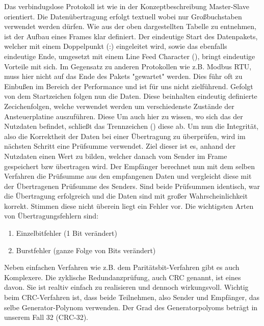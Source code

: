 Das verbindugslose Protokoll ist wie in der Konzeptbeschreibung Master-Slave orientiert. Die Datenübertragung erfolgt textuell wobei nur Großbuchstaben verwendet werden dürfen.\newline\newline
Wie aus der oben dargestellten Tabelle zu entnehmen, ist der Aufbau eines Frames klar definiert. Der eindeutige Start des Datenpakets, welcher mit einem Doppelpunkt (:) eingeleitet wird, sowie das ebenfalls eindeutige Ende, umgesetzt mit einem Line Feed Character (),
bringt eindeutige Vorteile mit sich. Im Gegensatz zu anderen Protokollen wie z.B. Modbus RTU, muss hier nicht auf das Ende des Pakets "gewartet" werden. Dies führ oft zu Einbußen im Bereich der Performance und ist für uns nicht zielführend.\newline\newline
Gefolgt von dem Startzeichen folgen nun die Daten. Diese beinhalten eindeutig definierte Zecichenfolgen, welche verwendet werden um verschiedenste Zustände der Ansteuerplatine auszuführen. Diese Um auch hier zu wissen, wo sich das der Nutzdaten befindet, schließt das Trennzeichen () diese ab.\newline\newline
Um nun die Integrität, also die Korrektheit der Daten bei einer Übertragung zu überprüfen, wird im nächsten Schritt eine Prüfsumme verwendet. Ziel dieser ist es, anhand der Nutzdaten einen Wert zu bilden, welcher danach vom Sender im Frame gespeichert bzw übertragen wird.
Der Empfänger berechnet nun mit dem selben Verfahren die Prüfsumme aus den empfangenen Daten und vergleicht diese mit der Übertragenen Prüfsumme des Senders. Sind beide Prüfsummen identisch, war die Übertragung erfolgreich und die Daten sind mit großer Wahrscheinlichkeit korrekt.
Stimmen diese nicht überein liegt ein Fehler vor. Die wichtigsten Arten von Übertragungsfehlern sind:
\begin{enumerate}
    \item Einzelbitfehler (1 Bit verändert)
    \item Burstfehler (ganze Folge von Bits verändert)
\end{enumerate}

Neben einfachen Verfahren wie z.B. dem Paritätsbit-Verfahren gibt es auch Komplexere. Die zyklische Redundanzprüfung, auch CRC genannt, ist eines davon. Sie ist realtiv einfach zu realisieren und dennoch wirkungsvoll.
Wichtig beim CRC-Verfahren ist, dass beide Teilnehmen, also Sender und Empfänger, das selbe Generator-Polynom verwenden. Der Grad des Generatorpolyoms beträgt in unserem Fall 32 (CRC-32).



